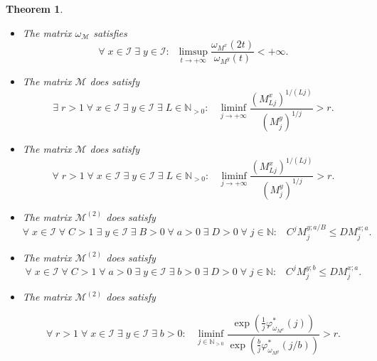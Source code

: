 \documentclass[10pt]{amsart}%
\numberwithin{equation}{section}
\theoremstyle{plain}
\newtheorem{theorem}[proposition]{Theorem}
\newcommand{\NN}{\mathbb{N}}
\begin{document}
\begin{theorem}
\begin{itemize}
\begin{itemize}
\item[$(ii)$] The matrix $\omega_{\mathcal{M}}$ satisfies
\begin{equation}\label{B-L-consequequ}
\forall\;x\in\mathcal{I}\;\exists\;y\in\mathcal{I}:\;\;
\limsup_{t\rightarrow+\infty}\frac{\omega_{M^x}(2t)}{\omega_{M^y}(t)}<+\infty.
\end{equation}

\item[$(iii)$] The matrix $\mathcal{M}$ does satisfy
\begin{equation}\label{omega1mixedcharactequbeurmod}
\exists\;r>1\;\forall\;x\in\mathcal{I}\;\exists\;y\in\mathcal{I}\;\exists\;L\in\NN_{>0}:\;\;\;\liminf_{j\rightarrow+\infty}\frac{(M^x_{Lj})^{1/(Lj)}}{(M^y_j)^{1/j}}>r.
\end{equation}

\item[$(iv)$] The matrix $\mathcal{M}$ does satisfy
\begin{equation}\label{omega1mixedcharactequbeurmodstrong}
\forall\;r>1\;\forall\;x\in\mathcal{I}\;\exists\;y\in\mathcal{I}\;\exists\;L\in\NN_{>0}:\;\;\;\liminf_{j\rightarrow+\infty}\frac{(M^x_{Lj})^{1/(Lj)}}{(M^y_j)^{1/j}}>r.
\end{equation}

\item[$(v)$] The matrix $\mathcal{M}^{(2)}$ does satisfy
\begin{equation*}%
\forall\;x\in\mathcal{I}\;\forall\;C> 1\;\exists\;y\in\mathcal{I}\;\exists\;B>0\;\forall\;a>0\;\exists\;D>0\;\forall\;j\in\NN:\;\;\; C^jM_j^{y;a/B}\le D M_j^{x;a}.
\end{equation*}

\item[$(vi)$] The matrix $\mathcal{M}^{(2)}$ does satisfy
\begin{equation}\label{naturalitycor1roumnewnewbeur}
\forall\;x\in\mathcal{I}\;\forall\;C> 1\;\forall\;a>0\;\exists\;y\in\mathcal{I}\;\exists\;b>0\;\exists\;D>0\;\forall\;j\in\NN:\;\;\;C^jM^{y;b}_j\le DM^{x;a}_j.
\end{equation}

\item[$(vii)$] The matrix $\mathcal{M}^{(2)}$ does satisfy

\begin{equation*}%
   \forall\;r>1\;\forall\;x\in\mathcal{I}\;\exists\;y\in\mathcal{I}\;\exists\;b>0:\;\;\; \liminf_{j\in\NN_{>0}}\frac{\exp(\frac{1}{j}\varphi^{*}_{\omega_{M^x}}(j))}{\exp(\frac{b}{j}\varphi^{*}_{\omega_{M^y}}(j/b))}>r.
\end{equation*}


\end{itemize}
\end{itemize}
\end{theorem}
\end{document}
